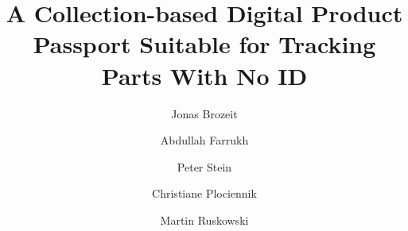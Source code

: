 \documentclass[3p,times,procedia]{elsarticle}
\begin{document}
\begin{frontmatter}




\title{A Collection-based Digital Product Passport Suitable for Tracking Parts With No ID}




\author[a]{Jonas Brozeit}
\author[a]{Abdullah Farrukh}
\author[a]{Peter Stein}
\author[a]{Christiane Plociennik}
\author[a]{Martin Ruskowski}

\address[a]{German Research Center for Artificial Intelligence (DFKI), Trippstadter Str. 122, 67663 Kaiserslautern, Germany}


\end{frontmatter}
\end{document}
